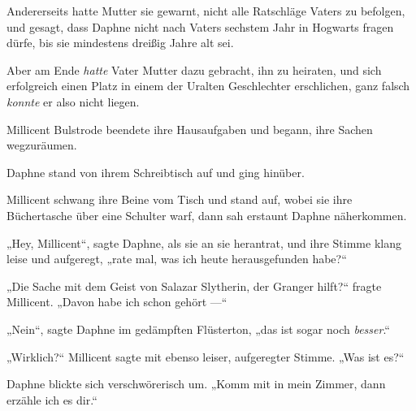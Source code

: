 Andererseits hatte Mutter sie gewarnt, nicht alle Ratschläge Vaters zu befolgen, und gesagt, dass Daphne nicht nach Vaters sechstem Jahr in Hogwarts fragen dürfe, bis sie mindestens dreißig Jahre alt sei.

Aber am Ende \emph{hatte} Vater Mutter dazu gebracht, ihn zu heiraten, und sich erfolgreich einen Platz in einem der Uralten Geschlechter erschlichen, ganz falsch \emph{konnte} er also nicht liegen.

Millicent Bulstrode beendete ihre Hausaufgaben und begann, ihre Sachen wegzuräumen.

Daphne stand von ihrem Schreibtisch auf und ging hinüber.

Millicent schwang ihre Beine vom Tisch und stand auf, wobei sie ihre Büchertasche über eine Schulter warf, dann sah erstaunt Daphne näherkommen.

„Hey, Millicent“, sagte Daphne, als sie an sie herantrat, und ihre Stimme klang leise und aufgeregt, „rate mal, was ich heute herausgefunden habe?“

„Die Sache mit dem Geist von Salazar Slytherin, der Granger hilft?“ fragte Millicent.
„Davon habe ich schon gehört —“

„Nein“, sagte Daphne im gedämpften Flüsterton, „das ist sogar noch \emph{besser}.“

„Wirklich?“ Millicent sagte mit ebenso leiser, aufgeregter Stimme.
„Was ist es?“

Daphne blickte sich verschwörerisch um.
„Komm mit in mein Zimmer, dann erzähle ich es dir.“

